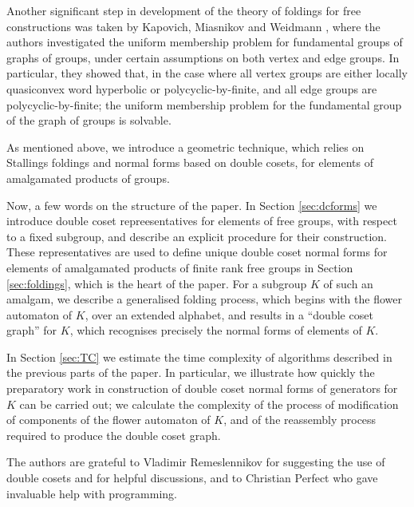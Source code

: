 \documentclass[a4paper,12pt]{article}
\numberwithin{equation}{section}
\numberwithin{figure}{section}
\begin{document}
Another significant step in development of the theory of foldings for  free constructions
 was taken by Kapovich, Miasnikov and Weidmann
\cite{KMW03}, where the authors investigated the uniform membership
problem for fundamental groups of graphs of groups, under certain
assumptions on both vertex and edge groups. In particular, they
showed that, in the case where all vertex groups are either locally
quasiconvex word hyperbolic or polycyclic-by-finite, and all edge
groups are polycyclic-by-finite; the uniform membership problem for the
fundamental group of the graph of groups is solvable.

As mentioned above, we  introduce a  geometric
technique, which relies on Stallings foldings and
normal forms based on double cosets, for elements of amalgamated products of
groups.

Now, a few words on the structure of the paper. In Section
\ref{sec:dcforms} we introduce double coset repreesentatives for
elements of free groups, with respect to a fixed subgroup,
and
  describe an explicit procedure
 for their construction.
These representatives are used to define unique double coset normal forms
for elements of
amalgamated products of finite rank free groups in Section  \ref{sec:foldings}, which
 is the heart of the paper. For a subgroup $K$ of such an amalgam, we
describe a generalised folding process, which begins with the flower automaton
of $K$, over an extended alphabet, and results in
a ``double coset graph'' for $K$, which  recognises
precisely the  normal forms of elements of $K$.

In Section \ref{sec:TC} we estimate the time complexity of
algorithms described in the previous parts of the paper. In
particular, we illustrate how quickly the  preparatory
work in construction of  double coset normal forms of generators
for $K$  can be carried out; we calculate  the complexity of the process of modification of
components of the flower automaton of $K$, and of the reassembly process required to
produce the double coset graph.

The authors are grateful to Vladimir Remeslennikov for suggesting the use of double cosets and
for helpful
discussions,  and to Christian Perfect who gave invaluable help with programming.
\end{document}
